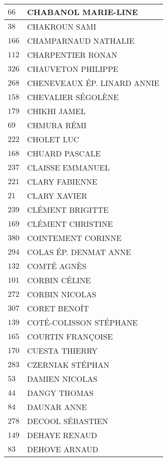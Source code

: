 \begin{xltabular}{\linewidth}{|l|X|}
    \hline
    $66$ & CHABANOL MARIE-LINE \\
    \hline
    $38$ & CHAKROUN SAMI \\
    \hline
    $166$ & CHAMPARNAUD NATHALIE \\
    \hline
    $112$ & CHARPENTIER RONAN \\
    \hline
    $326$ & CHAUVETON PHILIPPE \\
    \hline
    $268$ & CHENEVEAUX ÉP. LINARD ANNIE \\
    \hline
    $158$ & CHEVALIER SÉGOLÈNE \\
    \hline
    $179$ & CHIKHI JAMEL \\
    \hline
    $69$ & CHMURA RÉMI \\
    \hline
    $222$ & CHOLET LUC \\
    \hline
    $168$ & CHUARD PASCALE \\
    \hline
    $237$ & CLAISSE EMMANUEL \\
    \hline
    $221$ & CLARY FABIENNE \\
    \hline
    $21$ & CLARY XAVIER \\
    \hline
    $239$ & CLÉMENT BRIGITTE \\
    \hline
    $169$ & CLÉMENT CHRISTINE \\
    \hline
    $380$ & COINTEMENT CORINNE \\
    \hline
    $294$ & COLAS ÉP. DENMAT ANNE \\
    \hline
    $132$ & COMTÉ AGNÈS \\
    \hline
    $101$ & CORBIN CÉLINE \\
    \hline
    $272$ & CORBIN NICOLAS \\
    \hline
    $307$ & CORET BENOÎT \\
    \hline
    $139$ & COTÉ-COLISSON STÉPHANE \\
    \hline
    $165$ & COURTIN FRANÇOISE \\
    \hline
    $170$ & CUESTA THIERRY \\
    \hline
    $283$ & CZERNIAK STÉPHAN \\
    \hline
    $53$ & DAMIEN NICOLAS \\
    \hline
    $44$ & DANGY THOMAS \\
    \hline
    $84$ & DAUNAR ANNE \\
    \hline
    $278$ & DECOOL SÉBASTIEN \\
    \hline
    $149$ & DEHAYE RENAUD \\
    \hline
    $83$ & DEHOVE ARNAUD \\

\end{xltabular}
